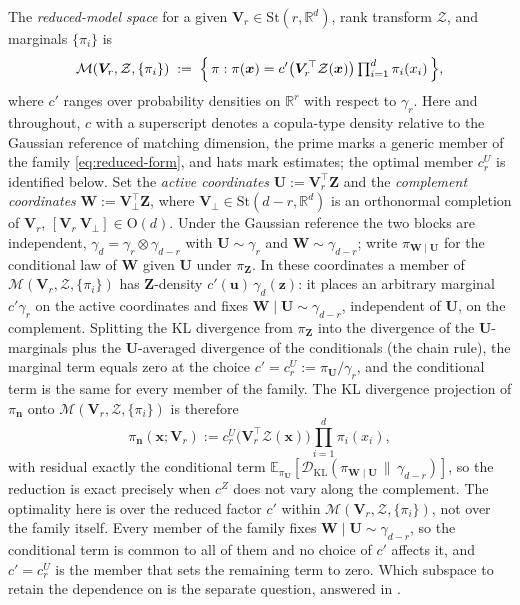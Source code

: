 \documentclass[review,hidelinks,onefignum,onetabnum]{siamart251216}
\newcommand{\RR}{\mathbb{R}}
\newcommand{\EE}{\mathbb{E}}
\newcommand{\DKL}{\mathcal{D}_{\mathrm{KL}}}
\newcommand{\gauss}{\gamma}
\newcommand{\mV}{\bm{V}}
\newcommand{\St}{\mathrm{St}}
\newcommand{\vn}{\bm{n}}
\newcommand{\vx}{\bm{x}}
\newcommand{\vz}{\bm{z}}
\newcommand{\vZ}{\bm{Z}}
\newcommand{\vu}{\bm{u}}
\newcommand{\vU}{\bm{U}}
\newcommand{\vW}{\bm{W}}
\newcommand{\scZ}{\mathcal{Z}}
\begin{document}
The \emph{reduced-model space} for a given $\mV_r \in \St(r,\RR^d)$, rank transform $\scZ$, and marginals $\{\pi_i\}$ is
\begin{equation}
  \mathcal M(\mV_r, \scZ, \{\pi_i\}) \;:=\; \Bigl\{\, \pi : \pi(\vx) = c'\bigl(\mV_r^\top \scZ(\vx)\bigr)\textstyle\prod_{i=1}^d \pi_i(x_i)\,\Bigr\},
  \label{eq:reduced-form}
\end{equation}
where $c'$ ranges over probability densities on $\RR^r$ with respect to $\gauss_r$. Here and throughout, $c$ with a superscript denotes a copula-type density relative to the Gaussian reference of matching dimension, the prime marks a generic member of the family \eqref{eq:reduced-form}, and hats mark estimates; the optimal member $c_r^{U}$ is identified below. Set the \emph{active coordinates} $\vU := \mV_r^\top\vZ$ and the \emph{complement coordinates} $\vW := \mV_\perp^\top\vZ$, where $\mV_\perp \in \St(d-r,\RR^d)$ is an orthonormal completion of $\mV_r$, $[\mV_r\ \mV_\perp] \in \mathrm{O}(d)$. Under the Gaussian reference the two blocks are independent, $\gauss_d = \gauss_r\otimes\gauss_{d-r}$ with $\vU\sim\gauss_r$ and $\vW\sim\gauss_{d-r}$; write $\pi_{\vW\mid\vU}$ for the conditional law of $\vW$ given $\vU$ under $\pi_{\vZ}$. In these coordinates a member of $\mathcal M(\mV_r, \scZ, \{\pi_i\})$ has $\vZ$-density $c'(\vu)\,\gauss_d(\vz)$: it places an arbitrary marginal $c'\gauss_r$ on the active coordinates and fixes $\vW\mid\vU \sim \gauss_{d-r}$, independent of $\vU$, on the complement. Splitting the KL divergence from $\pi_{\vZ}$ into the divergence of the $\vU$-marginals plus the $\vU$-averaged divergence of the conditionals (the chain rule), the marginal term equals zero at the choice $c' = c_r^{U} := \pi_{\vU}/\gauss_r$, and the conditional term is the same for every member of the family. The KL divergence projection of $\pi_{\vn}$ onto $\mathcal M(\mV_r, \scZ, \{\pi_i\})$ is therefore
\begin{equation}
  \pi_{\vn}(\vx;\mV_r) := c_r^{U}\!\bigl(\mV_r^\top \scZ(\vx)\bigr) \prod_{i=1}^d \pi_i(x_i),
  \label{eq:pi-star-form}
\end{equation}
with residual exactly the conditional term $\EE_{\pi_{\vU}}[\DKL(\pi_{\vW\mid\vU}\,\|\,\gauss_{d-r})]$, so the reduction is exact precisely when $c^{Z}$ does not vary along the complement. The optimality here is over the reduced factor $c'$ within $\mathcal M(\mV_r, \scZ, \{\pi_i\})$, not over the family itself. Every member of the family fixes $\vW\mid\vU\sim\gauss_{d-r}$, so the conditional term is common to all of them and no choice of $c'$ affects it, and $c' = c_r^{U}$ is the member that sets the remaining term to zero. Which subspace to retain the dependence on is the separate question, answered in .
\end{document}
